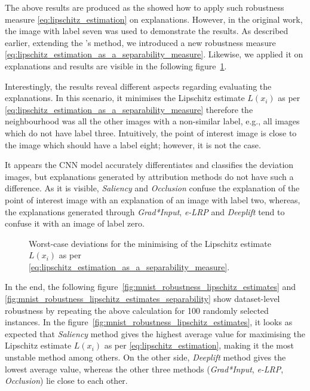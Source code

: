 \documentclass[english]{tktltiki2}
\theoremstyle{definition}
\theoremstyle{remark}
\begin{document}
The above results are produced as the \citet{alvarez2018robustness} showed how to apply such robustness measure \eqref{eq:lipschitz_estimation} on explanations. However, in the original work, the image with label seven was used to demonstrate the results. As described earlier, extending the \citet{alvarez2018robustness}'s method, we introduced a new robustness measure \eqref{eq:lipschitz_estimation_as_a_separability_measure}. Likewise, we applied it on explanations and results are visible in the following figure~\ref{fig:digit3_deviations_separability}.

Interestingly, the results reveal different aspects regarding evaluating the explanations. In this scenario, it minimises the Lipschitz estimate $L(x_i)$ as per \eqref{eq:lipschitz_estimation_as_a_separability_measure} therefore the neighbourhood was all the other images with a non-similar label, e.g., all images which do not have label three. Intuitively, the point of interest image is close to the image which should have a label eight; however, it is not the case. 

It appears the CNN model accurately differentiates and classifies the deviation images, but explanations generated by attribution methods do not have such a difference. As it is visible, \textit{Saliency} and \textit{Occlusion} confuse the explanation of the point of interest image with an explanation of an image with label two, whereas, the explanations generated through \textit{Grad*Input}, \textit{e-LRP} and \textit{Deeplift} tend to confuse it with an image of label zero.

\begin{figure}[H]
	\vspace*{-5mm}
	\centering
	\qquad
	\qquad
	\qquad
	\qquad
	\caption{Worst-case deviations for the minimising of the Lipschitz estimate $L(x_i)$ as per \eqref{eq:lipschitz_estimation_as_a_separability_measure}.}%
	\label{fig:digit3_deviations_separability}%
\end{figure}

In the end, the following figure~\ref{fig:mnist_robustness_lipschitz_estimates} and \ref{fig:mnist_robustness_lipschitz_estimates_separability} show dataset-level robustness by repeating the above calculation for 100 randomly selected instances. In the figure~\ref{fig:mnist_robustness_lipschitz_estimates}, it looks as expected that \textit{Saliency} method gives the highest average value for maximising the Lipschitz estimate $L(x_i)$ as per \eqref{eq:lipschitz_estimation}, making it the most unstable method among others.  On the other side, \textit{Deeplift} method gives the lowest average value, whereas the other three methods (\textit{Grad*Input}, \textit{e-LRP}, \textit{Occlusion}) lie close to each other.
\end{document}
